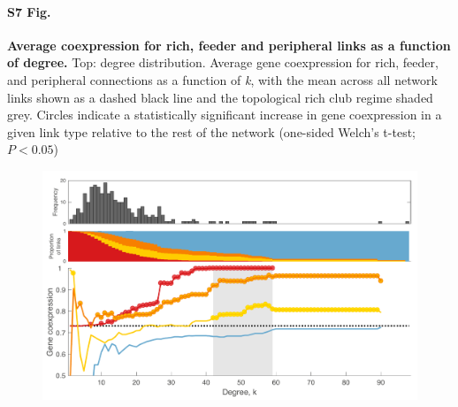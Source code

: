 \documentclass[10pt,letterpaper]{article}
\begin{document}
\paragraph*{S7 Fig.}
{\bf Average coexpression for rich, feeder and peripheral links as a function of degree.}
Top: degree distribution. Average gene coexpression for rich, feeder, and peripheral connections as a function of \textit{k}, with the mean across all network links shown as a dashed black line and the topological rich club regime shaded grey.
Circles indicate a statistically significant increase in gene coexpression in a given link type relative to the rest of the network (one-sided Welch’s t-test; $P < 0.05$)
\begin{figure}[!h]
\label{S8_Fig}
\centering
    \includegraphics[width=1\textwidth]{coXmeanCoexpression.pdf}
\end{figure}
\end{document}
